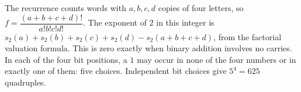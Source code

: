 The recurrence counts words with $a,b,c,d$ copies of four letters, so $f=\dfrac{(a+b+c+d)!}{a!b!c!d!}$. The exponent of $2$ in this integer is $s_2(a)+s_2(b)+s_2(c)+s_2(d)-s_2(a+b+c+d)$, from the factorial valuation formula. This is zero exactly when binary addition involves no carries. In each of the four bit positions, a $1$ may occur in none of the four numbers or in exactly one of them: five choices. Independent bit choices give $\boxed{5^4=625}$ quadruples.
